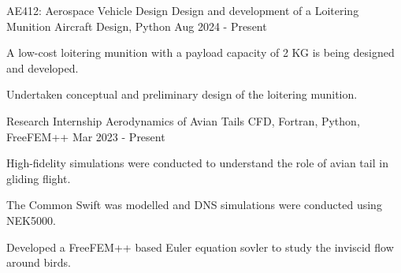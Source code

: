 
\begin{cventries}
  \cventry
  {AE412: Aerospace Vehicle Design} %
  {Design and development of a Loitering Munition} %
  {Aircraft Design, Python} %
  {Aug 2024 - Present} %
  {
    \begin{cvitems} %
      \item {A low-cost loitering munition with a payload capacity of 2 KG is being designed and developed.}
      \item {Undertaken conceptual and preliminary design of the loitering munition.}
    \end{cvitems}
  }
  \cventry
  {Research Internship} %
  {Aerodynamics of Avian Tails} %
  {CFD, Fortran, Python, FreeFEM++} %
  {Mar 2023 - Present} %
  {
    \begin{cvitems} %
      \item {High-fidelity simulations were conducted to understand the role of avian tail in gliding flight.}
      \item {The Common Swift was modelled and DNS simulations were conducted using NEK5000.}
      \item {Developed a FreeFEM++ based Euler equation sovler to study the inviscid flow around birds.}
    \end{cvitems}
  }


\end{cventries}
